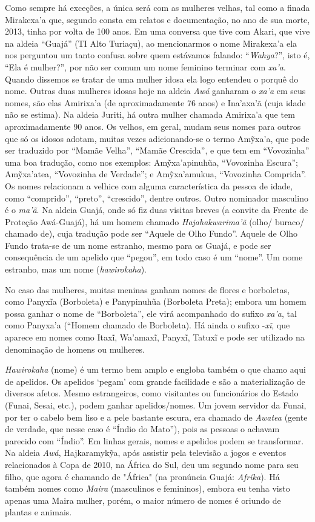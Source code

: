 Como sempre há exceções, a única será com as mulheres velhas, tal como a
finada Mirakexa'a que, segundo consta em relatos e documentação, no ano
de sua morte, 2013, tinha por volta de 100 anos. Em uma conversa que
tive com Akari, que vive na aldeia ``Guajá'' (TI Alto Turiaçu), ao
mencionarmos o nome Mirakexa'a ela nos perguntou um tanto confusa sobre
quem estávamos falando: ``\emph{Wahya}?'', isto é, ``Ela é mulher?'',
por não ser comum um nome feminino terminar com \emph{xa'a}. Quando
dissemos se tratar de uma mulher idosa ela logo entendeu o porquê do
nome. Outras duas mulheres idosas hoje na aldeia \emph{Awá} ganharam o
\emph{xa'a} em seus nomes, são elas Amirixa'a (de aproximadamente 76
anos) e Ina'axa'ã (cuja idade não se estima). Na aldeia Juriti, há outra
mulher chamada Amirixa'a que tem aproximadamente 90 anos. Os velhos, em
geral, mudam seus nomes para outros que só os idosos adotam, muitas
vezes adicionando-se o termo Amỹxa'a, que pode ser traduzido por ``Mamãe
Velha'', ``Mamãe Crescida'', e que tem em ``Vovozinha'' uma boa
tradução, como nos exemplos: Amỹxa'apinuhũa, ``Vovozinha Escura'';
Amỹxa'atea, ``Vovozinha de Verdade''; e Amỹxa'amukua, ``Vovozinha
Comprida''. Os nomes relacionam a velhice com alguma característica da
pessoa de idade, como ``comprido'', ``preto'', ``crescido'', dentre
outros. Outro nominador masculino é o \emph{ma'ã}. Na aldeia Guajá, onde
só fiz duas visitas breves (a convite da Frente de Proteção Awá-Guajá),
há um homem chamado \emph{Hajahakwarima'ã} (olho/ buraco/ chamado de),
cuja tradução pode ser ``Aquele de Olho Fundo''. Aquele de Olho Fundo
trata-se de um nome estranho, mesmo para os Guajá, e pode ser
consequência de um apelido que ``pegou'', em todo caso é um ``nome''. Um
nome estranho, mas um nome (\emph{hawirokaha}).

No caso das mulheres, muitas meninas ganham nomes de flores e
borboletas, como Panyxĩa (Borboleta) e Panypinuhũa (Borboleta Preta);
embora um homem possa ganhar o nome de ``Borboleta'', ele virá
acompanhado do sufixo \emph{xa'a}, tal como Panyxa'a (``Homem chamado de
Borboleta). Há ainda o sufixo -\emph{xĩ}, que aparece em nomes como
Itaxĩ, Wa'amaxĩ, Panyxĩ, Tatuxĩ e pode ser utilizado na denominação de
homens ou mulheres.

\emph{Hawirokaha} (nome) é um termo bem amplo e engloba também o que
chamo aqui de apelidos. Os apelidos `pegam' com grande facilidade e são
a materialização de diversos afetos. Mesmo estrangeiros, como visitantes
ou funcionários do Estado (Funai, Sesai, etc.), podem ganhar
apelidos/nomes. Um jovem servidor da Funai, por ter o cabelo bem liso e
a pele bastante escura, era chamado de \emph{Awatea} (gente de verdade,
que nesse caso é ``Índio do Mato''), pois as pessoas o achavam parecido
com ``Índio''. Em linhas gerais, nomes e apelidos podem se transformar.
Na aldeia \emph{Awá}, Hajkaramykỹa, após assistir pela televisão a jogos
e eventos relacionados à Copa de 2010, na África do Sul, deu um segundo
nome para seu filho, que agora é chamando de "África" (na pronúncia
Guajá: \emph{Afríka}). Há também nomes como \emph{Maira} (masculinos e
femininos), embora eu tenha visto apenas uma Maira mulher, porém, o
maior número de nomes é oriundo de plantas e animais.

